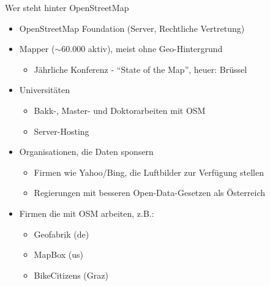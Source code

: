 \documentclass{beamer}
\begin{document}
\begin{frame}{Wer steht hinter OpenStreetMap}

  \begin{itemize}
    \item OpenStreetMap Foundation (Server, Rechtliche Vertretung)
      \pause
    \item Mapper ($\sim$60.000 aktiv), meist ohne Geo-Hintergrund
    \begin{itemize}
      \item Jährliche Konferenz - "`State of the Map"', heuer: Brüssel
    \end{itemize}
      \pause
    \item Universitäten
    \begin{itemize}
      \item Bakk-, Master- und Doktorarbeiten mit OSM
      \item Server-Hosting
    \end{itemize}
      \pause
    \item Organisationen, die Daten sponsern
    \begin{itemize}
      \item Firmen wie Yahoo/Bing, die Luftbilder zur Verfügung stellen
      \item Regierungen mit besseren Open-Data-Gesetzen als Österreich
    \end{itemize}
      \pause
    \item Firmen die mit OSM arbeiten, z.B.:
    \begin{itemize}
      \item Geofabrik (de)
      \item MapBox (us)
      \item BikeCitizens (Graz)
    \end{itemize}
  \end{itemize}



\end{frame}
\end{document}
